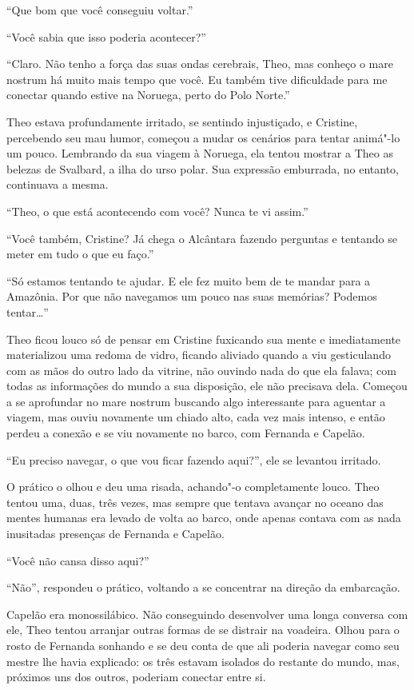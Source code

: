 ``Que bom que você conseguiu voltar.''

``Você sabia que isso poderia acontecer?''

``Claro. Não tenho a força das suas ondas cerebrais, Theo, mas conheço o
mare nostrum há muito mais tempo que você. Eu também tive dificuldade
para me conectar quando estive na Noruega, perto do Polo Norte.''

Theo estava profundamente irritado, se sentindo injustiçado, e Cristine,
percebendo seu mau humor, começou a mudar os cenários para tentar
animá"-lo um pouco. Lembrando da sua viagem à Noruega, ela tentou mostrar
a Theo as belezas de Svalbard, a ilha do urso polar. Sua expressão
emburrada, no entanto, continuava a mesma.

``Theo, o que está acontecendo com você? Nunca te vi assim.''

``Você também, Cristine? Já chega o Alcântara fazendo perguntas e
tentando se meter em tudo o que eu faço.''

``Só estamos tentando te ajudar. E ele fez muito bem de te mandar para a
Amazônia. Por que não navegamos um pouco nas suas memórias? Podemos
tentar\ldots{}''

Theo ficou louco só de pensar em Cristine fuxicando sua mente e
imediatamente materializou uma redoma de vidro, ficando aliviado quando
a viu gesticulando com as mãos do outro lado da vitrine, não ouvindo
nada do que ela falava; com todas as informações do mundo a sua
disposição, ele não precisava dela. Começou a se aprofundar no mare
nostrum buscando algo interessante para aguentar a viagem, mas ouviu
novamente um chiado alto, cada vez mais intenso, e então perdeu a conexão
e se viu novamente no barco, com Fernanda e Capelão.

``Eu preciso navegar, o que vou ficar fazendo aqui?'', ele se levantou
irritado.

O prático o olhou e deu uma risada, achando"-o completamente louco. Theo
tentou uma, duas, três vezes, mas sempre que tentava avançar no oceano
das mentes humanas era levado de volta ao barco, onde apenas contava com
as nada inusitadas presenças de Fernanda e Capelão.

``Você não cansa disso aqui?''

``Não'', respondeu o prático, voltando a se concentrar na direção da
embarcação.

Capelão era monossilábico. Não conseguindo desenvolver uma longa
conversa com ele, Theo tentou arranjar outras formas de se distrair na
voadeira. Olhou para o rosto de Fernanda sonhando e se deu conta de que
ali poderia navegar como seu mestre lhe havia explicado: os três estavam
isolados do restante do mundo, mas, próximos uns dos outros, poderiam
conectar entre si.

